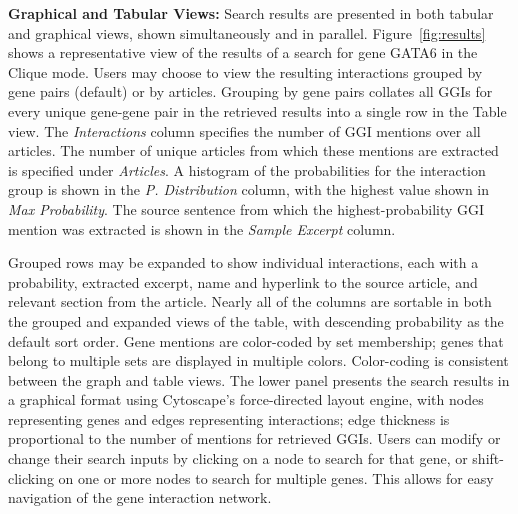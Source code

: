 \documentclass{ws-procs11x85}
\begin{document}
\noindent \textbf{Graphical and Tabular Views:} Search results are presented in both tabular and graphical views, shown simultaneously and in parallel. Figure~\ref{fig:results} shows a representative view of the results of a search for gene GATA6 in the Clique mode. Users may choose to view the resulting interactions grouped by gene pairs (default) or by articles. Grouping by gene pairs collates all GGIs for every unique gene-gene pair in the retrieved results into a single row in the Table view. The \emph{Interactions} column specifies the number of GGI mentions over all articles. The number of unique articles from which these mentions are extracted is specified under \emph{Articles}. A histogram of the probabilities for the interaction group is shown in the \emph{P. Distribution} column, with the highest value shown in \emph{Max Probability}. The source sentence from which the highest-probability GGI mention was extracted is shown in the \emph{Sample Excerpt} column. 

Grouped rows may be expanded to show individual interactions, each with a probability, extracted excerpt, name and hyperlink to the source article, and relevant section from the article. Nearly all of the columns are sortable in both the grouped and expanded views of the table, with descending probability as the default sort order. Gene mentions are color-coded by set membership; genes that belong to multiple sets are displayed in multiple colors. Color-coding is consistent between the graph and table views. The lower panel presents the search results in a graphical format using Cytoscape's force-directed layout engine, with nodes representing genes and edges representing interactions; edge thickness is proportional to the number of mentions for retrieved GGIs. Users can modify or change their search inputs by clicking on a node to search for that gene, or shift-clicking on one or more nodes to search for multiple genes. This allows for easy navigation of the gene interaction network. \newline
\end{document}
